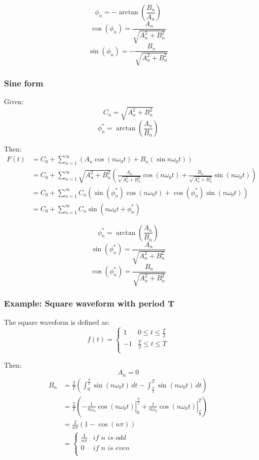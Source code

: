 \documentclass[11pt]{article}
\begin{document}
\[\phi_n = - \arctan \left(\frac{B_n}{A_n} \right)\]
\[\cos (\phi_n) = \frac{A_n}{\sqrt{A_n^2 + B_n^2}}\]
\[\sin (\phi_n) = - \frac{B_n}{\sqrt{A_n^2 + B_n^2}}\]

 \newpage
\subsubsection{Sine form}
\label{sec:org71cb051}
Given:
\[C_n = \sqrt{A_n^2 + B_n^2}\]
\[\phi_n^* = \arctan \left(\frac{A_n}{B_n} \right)\]

Then:
\begin{align*}
F(t) &= C_0 + \sum_{n = 1}^{\infty} \left(A_n \cos (n \omega_0 t) + B_n (\sin n \omega_0 t) \right) \\
&= C_0 + \sum_{n = 1}^{\infty} \sqrt{A_n^2 + B_n^2} \left(\frac{A_n}{\sqrt{A_n^2 + B_n^2}} \cos (n \omega_0 t) + \frac{B_n}{\sqrt{A_n^2 + B_n^2}} \sin (n \omega_0 t) \right) \\
&= C_0 + \sum_{n = 1}^{\infty} C_n \left(\sin (\phi_n^*) \cos (n \omega_0 t) + \cos (\phi_n^*) \sin (n \omega_0 t) \right) \\
&= C_0 + \sum_{n = 1}^{\infty} C_n \sin (n \omega_0 t + \phi_n^*)
\end{align*}

\[\phi_n^* = \arctan \left(\frac{A_n}{B_n} \right)\]
\[\sin (\phi_n^*) = \frac{A_n}{\sqrt{A_n^2 + B_n^2}}\]
\[\cos (\phi_n^*) = \frac{B_n}{\sqrt{A_n^2 + B_n^2}}\]

 \newpage
\subsubsection{Example: Square waveform with period T}
\label{sec:org5c3744f}
The square waveform is defined as:
\begin{displaymath}
f(t) = \begin{cases}
1 & 0 \le t \le \frac{T}{2} \\
-1 & \frac{T}{2} \le t \le T \\
\end{cases}
\end{displaymath}

Then:
\[A_n = 0\]
\begin{align*}
B_n &= \frac{2}{T} \left(\int_0^{\frac{T}{2}} \sin (n \omega_0 t) \, dt - \int_{\frac{T}{2}}^T \sin (n \omega_0 t) \, dt \right) \\
&= \frac{2}{T} \left(- \left.\frac{1}{n \omega_0} \cos (n \omega_0 t) \right|_0^{\frac{T}{2}} + \left. \frac{1}{n \omega_0} \cos (n \omega_0 t) \right|_{\frac{T}{2}}^T \right) \\
&= \frac{2}{n \pi} (1 - \cos (n \pi)) \\
&= \begin{cases}
\frac{4}{n \pi} & \textit{if } n \textit{ is odd} \\
0 & \textit{if } n \textit{ is even} \\
\end{cases}
\end{align*}
\end{document}
